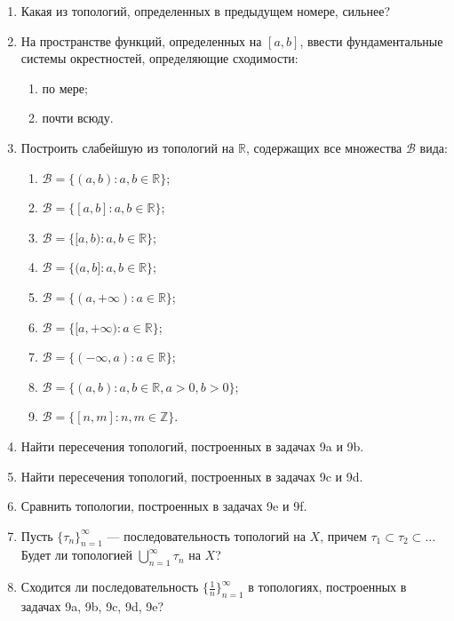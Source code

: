 \documentclass[12pt,a4paper]{article}
\begin{document}
\begin{enumerate}
\item Какая из топологий, определенных в предыдущем номере, сильнее?

\item На пространстве функций, определенных на $[a, b]$, ввести фундаментальные системы окрестностей, определяющие сходимости:
\begin{enumerate}[label=\alph*)]
\item по мере;
\item почти всюду.
\end{enumerate}

\item Построить слабейшую из топологий на $\mathbb{R}$, содержащих все множества $\mathcal{B}$ вида:
\begin{enumerate}[label=\alph*)]
\item $\mathcal{B} = \{(a, b) : a, b \in \mathbb{R}\}$;
\item $\mathcal{B} = \{[a, b] : a, b \in \mathbb{R}\}$;
\item $\mathcal{B} = \{[a, b) : a, b \in \mathbb{R}\}$;
\item $\mathcal{B} = \{(a, b] : a, b \in \mathbb{R}\}$;
\item $\mathcal{B} = \{(a, +\infty) : a \in \mathbb{R}\}$;
\item $\mathcal{B} = \{[a, +\infty) : a \in \mathbb{R}\}$;
\item $\mathcal{B} = \{(-\infty, a) : a \in \mathbb{R}\}$;
\item $\mathcal{B} = \{(a, b) : a, b \in \mathbb{R}, a > 0, b > 0\}$;
\item $\mathcal{B} = \{[n, m] : n, m \in \mathbb{Z}\}$.
\end{enumerate}

\item Найти пересечения топологий, построенных в задачах 9a и 9b.
\item Найти пересечения топологий, построенных в задачах 9c и 9d.
\item Сравнить топологии, построенных в задачах 9e и 9f.

\item Пусть $\{\tau_{n}\}_{n=1}^{\infty}$ — последовательность топологий на $X$, причем $\tau_{1} \subset \tau_{2} \subset \dots$ Будет ли топологией $\bigcup_{n=1}^{\infty} \tau_{n}$ на $X$?

\item Сходится ли последовательность $\{\frac{1}{n}\}_{n=1}^{\infty}$ в топологиях, построенных в задачах 9a, 9b, 9c, 9d, 9e?


\end{enumerate}
\end{document}

